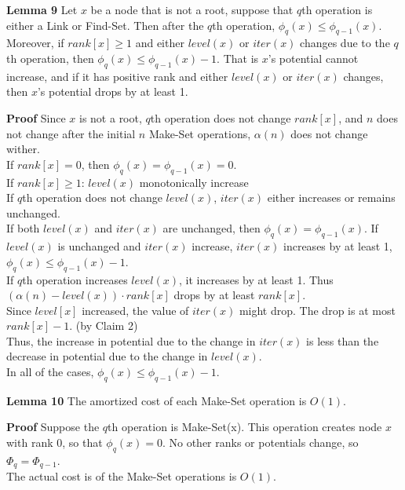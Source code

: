 \documentclass{beamer}
\begin{document}
\begin{frame}{}

{\bf Lemma 9} Let $x$ be a node that is not a root, suppose that $q$th operation is either a {\sc Link}
 or {\sc Find-Set}. Then after the $q$th operation, $\phi_q(x)\le \phi_{q-1}(x)$. \\
Moreover, if $rank[x]\ge 1$ and either $level(x)$ or $iter(x)$ changes due to the $q$th operation,
then $\phi_q(x)\le \phi_{q-1}(x)-1$. That is $x$'s potential cannot increase, and if it has positive
rank and either $level(x)$ or $iter(x)$ changes, then $x$'s potential drops by at least 1. 

{\bf Proof} Since $x$ is not a root, $q$th operation does not change $rank[x]$, and $n$ does not change after
 the initial $n$ {\sc Make-Set} operations, $\alpha(n)$ does not change wither. \\
If $rank[x]=0$, then $\phi_q(x)=\phi_{q-1}(x)=0$. \\
If $rank[x]\ge 1$: $level(x)$ monotonically increase \\
If $q$th operation does not change $level(x)$, $iter(x)$ either increases or remains unchanged. \\
If both $level(x)$ and $iter(x)$ are unchanged, then $\phi_q(x)=\phi_{q-1}(x)$. 
If $level(x)$ is unchanged and $iter(x)$ increase, $iter(x)$ increases by at least 1,
 $\phi_q(x)\le \phi_{q-1}(x)-1$. \\
If $q$th operation increases $level(x)$, it increases by at least 1. Thus $(\alpha(n)-level(x))\cdot rank[x]$
drops by at least $rank[x]$. \\
Since $level[x]$ increased, the value of $iter(x)$ might drop. The drop is at most $rank[x]-1$. (by Claim 2)\\
Thus, the increase in potential due to the change in $iter(x)$ is less than the decrease in potential
 due to the change in $level(x)$. \\
In all of the cases, $\phi_q(x)\le\phi_{q-1}(x)-1$. 
\end{frame}

\begin{frame}{}

{\bf Lemma 10} The amortized cost of each {\sc Make-Set} operation is $O(1)$. 

{\bf Proof} Suppose the $q$th operation is {\sc Make-Set}(x). This operation creates node
$x$ with rank 0, so that $\phi_q(x)=0$.
No other ranks or potentials change, so $\Phi_q=\Phi_{q-1}$. \\
The actual cost is of the {\sc Make-Set} operations is $O(1)$. 
\end{frame}
\end{document}
